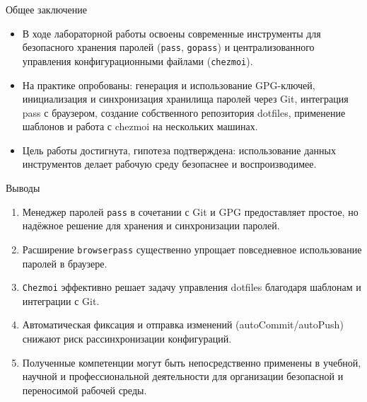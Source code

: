 \documentclass[
  ignorenonframetext,
  aspectratio=169,
  russian,
  aspectratio=169]{beamer}
\providecommand{\tightlist}{%
  \setlength{\itemsep}{0pt}\setlength{\parskip}{0pt}}
\begin{document}
\begin{frame}[fragile]{Общее заключение}
\protect{}\label{ux43eux431ux449ux435ux435-ux437ux430ux43aux43bux44eux447ux435ux43dux438ux435}
\begin{itemize}[<+->]
\tightlist
\item
  В ходе лабораторной работы освоены современные инструменты для
  безопасного хранения паролей (\texttt{pass}, \texttt{gopass}) и
  централизованного управления конфигурационными файлами
  (\texttt{chezmoi}).
\item
  На практике опробованы: генерация и использование GPG-ключей,
  инициализация и синхронизация хранилища паролей через Git, интеграция
  pass с браузером, создание собственного репозитория dotfiles,
  применение шаблонов и работа с chezmoi на нескольких машинах.
\item
  Цель работы достигнута, гипотеза подтверждена: использование данных
  инструментов делает рабочую среду безопаснее и воспроизводимее.
\end{itemize}
\end{frame}

\begin{frame}[fragile]{Выводы}
\protect{}\label{ux432ux44bux432ux43eux434ux44b-1}
\begin{enumerate}[<+->]
\tightlist
\item
  Менеджер паролей \texttt{pass} в сочетании с Git и GPG предоставляет
  простое, но надёжное решение для хранения и синхронизации паролей.
\item
  Расширение \texttt{browserpass} существенно упрощает повседневное
  использование паролей в браузере.
\item
  \texttt{Chezmoi} эффективно решает задачу управления dotfiles
  благодаря шаблонам и интеграции с Git.
\item
  Автоматическая фиксация и отправка изменений (autoCommit/autoPush)
  снижают риск рассинхронизации конфигураций.
\item
  Полученные компетенции могут быть непосредственно применены в учебной,
  научной и профессиональной деятельности для организации безопасной и
  переносимой рабочей среды.
\end{enumerate}
\end{frame}
\end{document}
